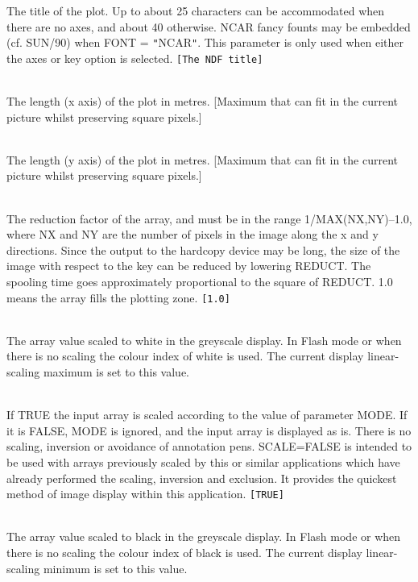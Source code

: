 \documentclass[twoside,11pt]{article}
\newcommand{\sstsubsection}[1]{ \item[{#1}] \mbox{} \\}
\newcommand{\sstsubsection}[1]{\item[{#1}]}
\begin{document}
{{{      }{
         The title of the plot.  Up to about 25 characters can be
         accommodated when there are no axes, and about 40 otherwise.
         NCAR fancy founts may be embedded (cf. SUN/90) when FONT =
         {\tt "}NCAR{\tt "}.  This parameter is only used when either the axes or
         key option is selected. {\tt [The NDF title]}
      }
      \sstsubsection{
         PXSIZE = \_REAL (Read)
      }{
         The length (x axis) of the plot in metres.  [Maximum that can
         fit in the current picture whilst preserving square pixels.]
      }
      \sstsubsection{
         PYSIZE = \_REAL (Read)
      }{
         The length (y axis) of the plot in metres.  [Maximum that can
         fit in the current picture whilst preserving square pixels.]
      }
      \sstsubsection{
         REDUCT = \_REAL (Read)
      }{
         The reduction factor of the array, and must be in the range
         1/MAX(NX,NY)--1.0, where NX and NY are the number of pixels
         in the image along the x and y directions.  Since the output
         to the hardcopy device may be long, the size of the image
         with respect to the key can be reduced by lowering REDUCT.
         The spooling time goes approximately proportional to the
         square of REDUCT.  1.0 means the array fills the plotting zone.
         {\tt [1.0]}
      }
      \sstsubsection{
         SCAHIGH = \_DOUBLE (Write)
      }{
         The array value scaled to white in the greyscale display.
         In Flash mode or when there is no scaling the colour index of
         white is used.  The current display linear-scaling maximum is
         set to this value.
      }
      \sstsubsection{
         SCALE = \_LOGICAL (Read)
      }{
         If TRUE the input array is scaled according to the value of
         parameter MODE.  If it is FALSE, MODE is ignored, and the input
         array is displayed as is.  There is no scaling, inversion
         or avoidance of annotation pens.  SCALE=FALSE is intended to
         be used with arrays previously scaled by this or similar
         applications which have already performed the scaling,
         inversion and exclusion.  It provides the quickest method of
         image display within this application. {\tt [TRUE]}
      }
      \sstsubsection{
         SCALOW = \_DOUBLE (Write)
      }{
         The array value scaled to black in the greyscale display.
         In Flash mode or when there is no scaling the colour index of
         black is used.  The current display linear-scaling minimum is
         set to this value.
      }
      \sstsubsection{
}}}
\end{document}
